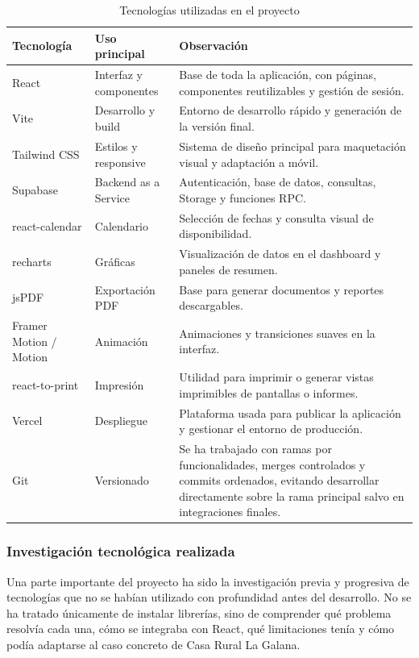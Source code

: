 \documentclass[11pt,a4paper]{article}
\begin{document}
\begin{table}[H]
\centering
\small
\begin{tabularx}{\textwidth}{|p{4cm}|p{3.2cm}|X|}
\hline
\textbf{Tecnología} & \textbf{Uso principal} & \textbf{Observación} \\
\hline
React & Interfaz y componentes & Base de toda la aplicación, con páginas, componentes reutilizables y gestión de sesión. \\
\hline
Vite & Desarrollo y build & Entorno de desarrollo rápido y generación de la versión final. \\
\hline
Tailwind CSS & Estilos y responsive & Sistema de diseño principal para maquetación visual y adaptación a móvil. \\
\hline
Supabase & Backend as a Service & Autenticación, base de datos, consultas, Storage y funciones RPC. \\
\hline
react-calendar & Calendario & Selección de fechas y consulta visual de disponibilidad. \\
\hline
recharts & Gráficas & Visualización de datos en el dashboard y paneles de resumen. \\
\hline
jsPDF & Exportación PDF & Base para generar documentos y reportes descargables. \\
\hline
Framer Motion / Motion & Animación & Animaciones y transiciones suaves en la interfaz. \\
\hline
react-to-print & Impresión & Utilidad para imprimir o generar vistas imprimibles de pantallas o informes. \\
\hline
Vercel & Despliegue & Plataforma usada para publicar la aplicación y gestionar el entorno de producción. \\
\hline
Git & Versionado & Se ha trabajado con ramas por funcionalidades, merges controlados y commits ordenados, evitando desarrollar directamente sobre la rama principal salvo en integraciones finales. \\
\hline
\end{tabularx}
\caption{Tecnologías utilizadas en el proyecto}
\end{table}

\subsubsection{Investigación tecnológica realizada}
Una parte importante del proyecto ha sido la investigación previa y progresiva de tecnologías que no se habían utilizado con profundidad antes del desarrollo. No se ha tratado únicamente de instalar librerías, sino de comprender qué problema resolvía cada una, cómo se integraba con React, qué limitaciones tenía y cómo podía adaptarse al caso concreto de Casa Rural La Galana.
\end{document}

